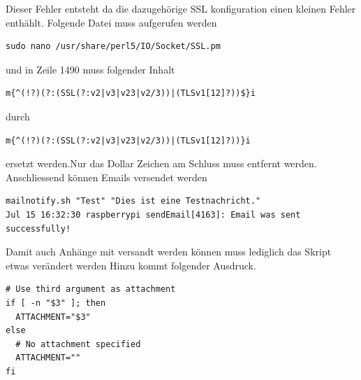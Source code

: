 \documentclass[11pt,a4paper]{article} %
\begin{document}
Dieser Fehler entsteht da die dazugeh\"orige SSL konfiguration einen kleinen Fehler enth\"ahlt.
Folgende Datei muss aufgerufen werden
\begin{frame}

\begin{lstlisting}
sudo nano /usr/share/perl5/IO/Socket/SSL.pm

\end{lstlisting}
\end{frame}

und in Zeile 1490 muss folgender Inhalt
\begin{frame}

\begin{lstlisting}
m{^(!?)(?:(SSL(?:v2|v3|v23|v2/3))|(TLSv1[12]?))$}i

\end{lstlisting}
\end{frame}

durch
\begin{frame}

\begin{lstlisting}
m{^(!?)(?:(SSL(?:v2|v3|v23|v2/3))|(TLSv1[12]?))}i

\end{lstlisting}
\end{frame}

ersetzt werden.Nur das Dollar Zeichen am Schluss muss entfernt werden. Anschliessend k\"onnen Emails versendet werden
\begin{frame}

\begin{lstlisting}
mailnotify.sh "Test" "Dies ist eine Testnachricht."
Jul 15 16:32:30 raspberrypi sendEmail[4163]: Email was sent successfully!

\end{lstlisting}
\end{frame}
\par
Damit auch Anh\"ange mit versandt werden k\"onnen muss lediglich das Skript etwas ver\"andert werden
Hinzu kommt folgender Ausdruck.
\begin{frame}

\begin{lstlisting}
# Use third argument as attachment
if [ -n "$3" ]; then
  ATTACHMENT="$3"
else
  # No attachment specified
  ATTACHMENT=""
fi

\end{lstlisting}
\end{frame}
\end{document}
